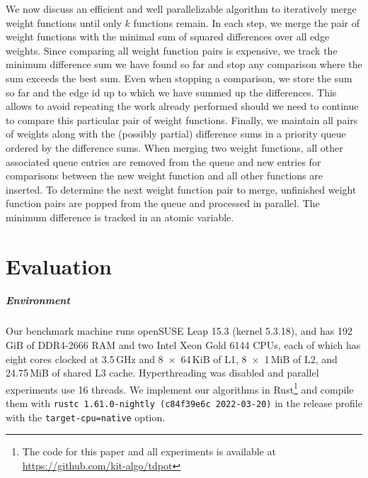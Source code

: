 \documentclass[a4paper,UKenglish,cleveref, autoref, thm-restate]{lipics-v2021}
\begin{document}
We now discuss an efficient and well parallelizable algorithm to iteratively merge weight functions until only $k$ functions remain.
In each step, we merge the pair of weight functions with the minimal sum of squared differences over all edge weights.
Since comparing all weight function pairs is expensive, we track the minimum difference sum we have found so far and stop any comparison where the sum exceeds the best sum.
Even when stopping a comparison, we store the sum so far and the edge id up to which we have summed up the differences.
This allows to avoid repeating the work already performed should we need to continue to compare this particular pair of weight functions.
Finally, we maintain all pairs of weights along with the (possibly partial) difference sums in a priority queue ordered by the difference sums.
When merging two weight functions, all other associated queue entries are removed from the queue and new entries for comparisons between the new weight function and all other functions are inserted.
To determine the next weight function pair to merge, unfinished weight function pairs are popped from the queue and processed in parallel.
The minimum difference is tracked in an atomic variable.

\section{Evaluation}
\subparagraph{Environment} Our benchmark machine runs openSUSE Leap 15.3 (kernel 5.3.18), and has 192\,GiB of DDR4-2666 RAM and two Intel Xeon Gold 6144 CPUs, each of which has eight cores clocked at 3.5\,GHz and 8~$\times$~64\,KiB of L1, 8~$\times$~1\,MiB of L2, and 24.75\,MiB of shared L3 cache.
Hyperthreading was disabled and parallel experiments use 16 threads.
We implement our algorithms in Rust\footnote{The code for this paper and all experiments is available at \url{https://github.com/kit-algo/tdpot}} and compile them with \texttt{rustc 1.61.0-nightly (c84f39e6c 2022-03-20)} in the release profile with the \texttt{target-cpu=native} option.
\end{document}
